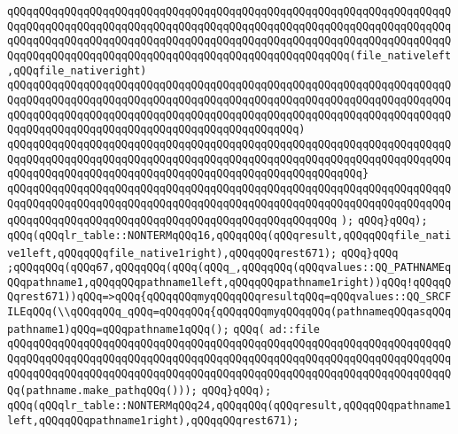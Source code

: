 \verb|qQQqqQQqqQQqqQQqqQQqqQQqqQQqqQQqqQQqqQQqqQQqqQQqqQQqqQQqqQQqqQQqqQQqqQQqqQQqqQQqqQQqqQQqqQQqqQQqqQQqqQQqqQQqqQQqqQQqqQQqqQQqqQQqqQQqqQQqqQQqqQQqqQQqqQQqqQQqqQQqqQQqqQQqqQQqqQQqqQQqqQQqqQQqqQQqqQQqqQQqqQQqqQQqqQQqqQQqqQQqqQQqqQQqqQQqqQQqqQQqqQQqqQQqqQQqqQQqqQQqqQQq(file_nativeleft,qQQqfile_nativeright)|\newline
\verb|qQQqqQQqqQQqqQQqqQQqqQQqqQQqqQQqqQQqqQQqqQQqqQQqqQQqqQQqqQQqqQQqqQQqqQQqqQQqqQQqqQQqqQQqqQQqqQQqqQQqqQQqqQQqqQQqqQQqqQQqqQQqqQQqqQQqqQQqqQQqqQQqqQQqqQQqqQQqqQQqqQQqqQQqqQQqqQQqqQQqqQQqqQQqqQQqqQQqqQQqqQQqqQQqqQQqqQQqqQQqqQQqqQQqqQQqqQQqqQQqqQQqqQQqqQQqqQQq)|\newline
\verb|qQQqqQQqqQQqqQQqqQQqqQQqqQQqqQQqqQQqqQQqqQQqqQQqqQQqqQQqqQQqqQQqqQQqqQQqqQQqqQQqqQQqqQQqqQQqqQQqqQQqqQQqqQQqqQQqqQQqqQQqqQQqqQQqqQQqqQQqqQQqqQQqqQQqqQQqqQQqqQQqqQQqqQQqqQQqqQQqqQQqqQQqqQQqqQQqqQQq}|\newline
\verb|qQQqqQQqqQQqqQQqqQQqqQQqqQQqqQQqqQQqqQQqqQQqqQQqqQQqqQQqqQQqqQQqqQQqqQQqqQQqqQQqqQQqqQQqqQQqqQQqqQQqqQQqqQQqqQQqqQQqqQQqqQQqqQQqqQQqqQQqqQQqqQQqqQQqqQQqqQQqqQQqqQQqqQQqqQQqqQQqqQQqqQQqqQQqqQQq|\newline
\verb|);|\newline
\verb|qQQq}qQQq);|\newline
\verb|qQQq(qQQqlr_table::NONTERMqQQq16,qQQqqQQq(qQQqresult,qQQqqQQqfile_native1left,qQQqqQQqfile_native1right),qQQqqQQqrest671);|\newline
\verb|qQQq}qQQq|\newline
\verb|;qQQqqQQq(qQQq67,qQQqqQQq(qQQq(qQQq_,qQQqqQQq(qQQqvalues::QQ_PATHNAMEqQQqpathname1,qQQqqQQqpathname1left,qQQqqQQqpathname1right))qQQq!qQQqqQQqrest671))qQQq=>qQQq{qQQqqQQqmyqQQqqQQqresultqQQq=qQQqvalues::QQ_SRCFILEqQQq(\\qQQqqQQq_qQQq=qQQqqQQq{qQQqqQQqmyqQQqqQQq(pathnameqQQqasqQQqpathname1)qQQq=qQQqpathname1qQQq();|\newline
\verb|qQQq(|\newline
\verb|ad::file|\newline
\verb|qQQqqQQqqQQqqQQqqQQqqQQqqQQqqQQqqQQqqQQqqQQqqQQqqQQqqQQqqQQqqQQqqQQqqQQqqQQqqQQqqQQqqQQqqQQqqQQqqQQqqQQqqQQqqQQqqQQqqQQqqQQqqQQqqQQqqQQqqQQqqQQqqQQqqQQqqQQqqQQqqQQqqQQqqQQqqQQqqQQqqQQqqQQqqQQqqQQqqQQqqQQqqQQqqQQq(pathname.make_pathqQQq()));|\newline
\verb|qQQq}qQQq);|\newline
\verb|qQQq(qQQqlr_table::NONTERMqQQq24,qQQqqQQq(qQQqresult,qQQqqQQqpathname1left,qQQqqQQqpathname1right),qQQqqQQqrest671);|\newline
